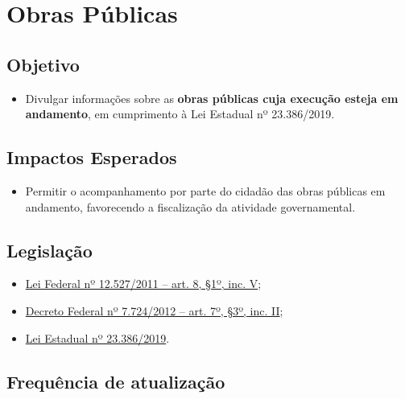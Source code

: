 \documentclass[]{book}
\providecommand{\tightlist}{%
  \setlength{\itemsep}{0pt}\setlength{\parskip}{0pt}}
\begin{document}
\hypertarget{obras-puxfablicas}{%
\section{Obras Públicas}\label{obras-puxfablicas}}

\hypertarget{objetivo-3}{%
\subsection{Objetivo}\label{objetivo-3}}

\begin{itemize}
\tightlist
\item
  Divulgar informações sobre as \textbf{obras públicas cuja execução esteja em andamento}, em cumprimento à Lei Estadual nº 23.386/2019.
\end{itemize}

\hypertarget{impactos-esperados-4}{%
\subsection{Impactos Esperados}\label{impactos-esperados-4}}

\begin{itemize}
\tightlist
\item
  Permitir o acompanhamento por parte do cidadão das obras públicas em andamento, favorecendo a fiscalização da atividade governamental.
\end{itemize}

\hypertarget{legislauxe7uxe3o-4}{%
\subsection{Legislação}\label{legislauxe7uxe3o-4}}

\begin{itemize}
\tightlist
\item
  \href{http://www.planalto.gov.br/ccivil_03/_ato2011-2014/2011/lei/l12527.htm\#art8}{Lei Federal nº 12.527/2011 -- art. 8, §1º, inc. V};
\item
  \href{http://www.planalto.gov.br/ccivil_03/_ato2011-2014/2012/decreto/d7724.htm\#art7}{Decreto Federal nº 7.724/2012 -- art. 7º, §3º, inc. II};
\item
  \href{https://www.almg.gov.br/consulte/legislacao/completa/completa.html?tipo=LEI\&num=23386\&comp=\&ano=2019}{Lei Estadual nº 23.386/2019}.
\end{itemize}

\hypertarget{frequuxeancia-de-atualizauxe7uxe3o-3}{%
\subsection{Frequência de atualização}\label{frequuxeancia-de-atualizauxe7uxe3o-3}}
\end{document}
